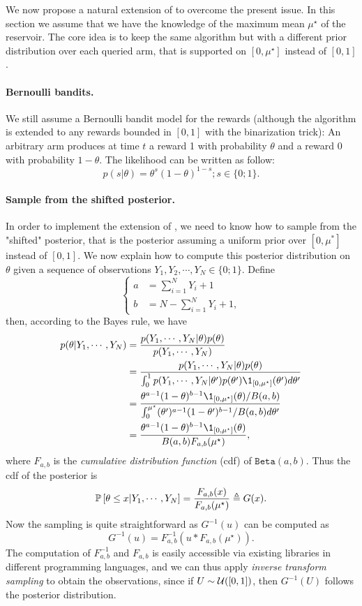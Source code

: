 We now propose a natural extension of \DTTTS to overcome the present issue. In this section we assume that we have the knowledge of the maximum mean $\mu^\star$ of the reservoir. The core idea is to keep the same algorithm but with a different prior distribution over each queried arm, that is supported on $[0, \mu^\star]$ instead of $[0, 1]$.

\paragraph{Bernoulli bandits.}
We still assume a Bernoulli bandit model for the rewards (although the algorithm is extended to any rewards bounded in $[0,1]$ with the binarization trick): An arbitrary arm produces at time $t$ a reward 1 with probability $\theta$ and a reward 0 with probability $1-\theta$. The likelihood can be written as follow:
\[
    p(s|\theta) = \theta^s(1-\theta)^{1-s}; s\in\{0;1\}.
\]

\paragraph{Sample from the shifted posterior.}
In order to implement the extension of \DTTTS, we need to know how to sample from the "shifted" posterior, that is the posterior assuming a uniform prior over $[0,\mu^*]$ instead of $[0,1]$. We now explain how to compute this posterior distribution on $\theta$ given a sequence of observations $Y_1,Y_2,\cdots,Y_N\in\{0;1\}$. Define
\[
    \left\{
    \begin{array}{ll}
        a &= \sum_{i=1}^N Y_i + 1 \\
        b &= N - \sum_{i=1}^N Y_i + 1,
    \end{array}
    \right.
\]
then, according to the Bayes rule, we have
\begin{align*}
    p(\theta|Y_1,\cdots,Y_N) &= \frac{p(Y_1,\cdots,Y_N|\theta)p(\theta)}{p(Y_1,\cdots,Y_N)} \\
                             &= \frac{p(Y_1,\cdots,Y_N|\theta)p(\theta)}{\int_0^1 p(Y_1,\cdots,Y_N|\theta')p(\theta')\1_{[0,\mu^\star]}(\theta')d\theta'} \\
                             &= \frac{\theta^{a-1}(1-\theta)^{b-1}\1_{[0,\mu^\star]}(\theta) / B(a,b)}{\int_{0}^{\mu^\star}(\theta')^{a-1}(1-\theta')^{b-1} / B(a,b) d\theta'} \\
                             &= \frac{\theta^{a-1}(1-\theta)^{b-1}\1_{[0,\mu^\star]}(\theta)}{B(a,b)F_{a,b}(\mu^\star)},
\end{align*}
where $F_{a,b}$ is the \emph{cumulative distribution function} (cdf) of $\texttt{Beta}(a,b)$. Thus the cdf of the posterior is
\[
    \mathbb{P}\left[\theta\leq x | Y_1,\cdots,Y_N\right] = \frac{F_{a,b}(x)}{F_{a,b}(\mu^\star)} \triangleq G(x).
\]
Now the sampling is quite straightforward as $G^{-1}(u)$ can be computed as
\[
    G^{-1}(u) = F_{a,b}^{-1} (u * F_{a,b}(\mu^\star)).
\]
The computation of $F_{a,b}^{-1}$ and $F_{a,b}$ is easily accessible via existing libraries in different programming languages, and we can thus apply \emph{inverse transform sampling} to obtain the observations, since if $U \sim \mathcal{U}([0,1])$, then $G^{-1}(U)$ follows the posterior distribution.

